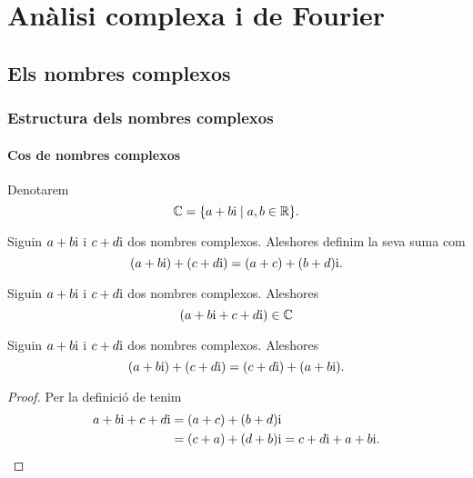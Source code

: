 \documentclass[../../Main.tex]{subfiles}
\begin{document}
\part{Anàlisi complexa i de Fourier}
\chapter{Els nombres complexos}
\section{Estructura dels nombres complexos}
	\subsection{Cos de nombres complexos}
	\begin{notation}
		\label{notation:cos de nombres complexos}
		Denotarem
		\[
            \mathbb{C} = \{a+b\mathrm{i}\mid a,b\in\mathbb{R}\}.
        \]
	\end{notation}
	\begin{definition}
        \label{def:suma de nombres complexos}
		Siguin \(a+b\mathrm{i}\) i \(c+d\mathrm{i}\) dos nombres complexos.
        Aleshores definim la seva suma com
		\[
            (a+b\mathrm{i})+(c+d\mathrm{i}) = (a+c)+(b+d)\mathrm{i}.
        \]
	\end{definition}
	\begin{observation}
		\label{obs:els nombres complexos estan tancats per la suma}
		Siguin \(a+b\mathrm{i}\) i \(c+d\mathrm{i}\) dos nombres complexos.
        Aleshores
		\[
            (a+b\mathrm{i}+c+d\mathrm{i})\in\mathbb{C}
        \]
	\end{observation}
	\begin{proposition}
		\label{prop:els nombres complexos commuten per la suma}
		Siguin \(a+b\mathrm{i}\) i \(c+d\mathrm{i}\) dos nombres complexos.
        Aleshores
		\[
            (a+b\mathrm{i})+(c+d\mathrm{i}) = (c+d\mathrm{i})+(a+b\mathrm{i}).
        \]
		\begin{proof}
			Per la definició de  tenim
			\begin{align*}
				a+b\mathrm{i}+c+d\mathrm{i} &= (a+c)+(b+d)\mathrm{i} \\
				 &= (c+a)+(d+b)\mathrm{i} = c+d\mathrm{i}+a+b\mathrm{i}.\qedhere
			\end{align*}
		\end{proof}
	\end{proposition}
\end{document}
